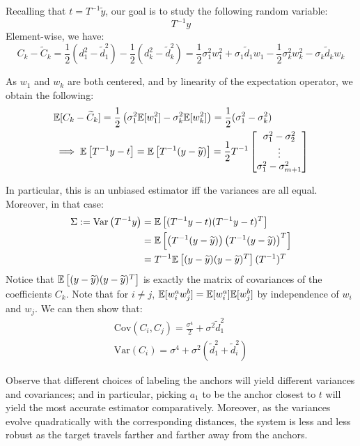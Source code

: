 Recalling that $t = T^{-1}\widetilde y$, our goal is to study the following random variable:
\[
    T^{-1}y
\]
Element-wise, we have:
\[
    C_k - \widetilde C_k = \frac{1}{2}(d_1^2 - \widetilde d_1^2) - \frac{1}{2}(d_k^2 - \widetilde d_k^2) = \frac{1}{2}\sigma_1^2 w_1^2 + \sigma_1\widetilde d_1 w_1 - \frac{1}{2}\sigma_k^2 w_k^2 - \sigma_k\widetilde d_k w_k
\]

As $w_1$ and $w_k$ are both centered, and by linearity of the expectation operator, we obtain the following:
\begin{align*}
    &\mathbb E[C_k - \widetilde C_k] = \frac{1}{2}\left(\sigma_1^2\mathbb E[w_1^2] - \sigma_k^2\mathbb E[w_k^2]\right) = \frac{1}{2}(\sigma_1^2 - \sigma_k^2) \\
    &\implies \mathbb E\left[T^{-1}y - t\right] = \mathbb E\left[T^{-1}(y-\widetilde y) \right] = \frac{1}{2}T^{-1}
    \begin{bmatrix}
        \sigma_1^2 - \sigma_2^2 \\
        \vdots \\
        \sigma_1^2 - \sigma_{m+1}^2
    \end{bmatrix}
\end{align*}

In particular, this is an unbiased estimator iff the variances are all equal. Moreover, in that case:
\begin{align*}
    \Sigma := \mathrm{Var}\left(T^{-1}y\right)
    &= \mathbb E\left[(T^{-1}y - t)(T^{-1}y - t)^T\right] \\
    &= \mathbb E\left[\left(T^{-1}(y-\widetilde y)\right)\left(T^{-1}(y-\widetilde y)\right)^T\right] \\
    &= T^{-1}\mathbb E\left[(y-\widetilde y)(y-\widetilde y)^T\right](T^{-1})^T
\end{align*}
Notice that $\mathbb E\left[(y-\widetilde y)(y-\widetilde y)^T\right]$ is exactly the matrix of covariances of the coefficients $C_k$. Note that for $i\neq j$, $\mathbb E[w_i^aw_j^b]=\mathbb E[w_i^a]\mathbb E[w_j^b]$ by independence of $w_i$ and $w_j$. We can then show that:
\begin{align*}
    \mathrm{Cov}(C_i,C_j) = \frac{\sigma^4}{2} + \sigma^2\widetilde d_1^2 \\
    \mathrm{Var}(C_i) = \sigma^4 + \sigma^2(\widetilde d_1^2 + \widetilde d_i^2)
\end{align*}

Observe that different choices of labeling the anchors will yield different variances and covariances; and in particular, picking $a_1$ to be the anchor closest to $t$ will yield the most accurate estimator comparatively. Moreover, as the variances evolve quadratically with the corresponding distances, the system is less and less robust as the target travels farther and farther away from the anchors.


